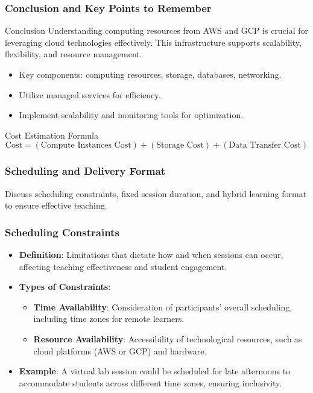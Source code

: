 \documentclass[aspectratio=169]{beamer}
\begin{document}
\begin{frame}[fragile]
    \frametitle{Conclusion and Key Points to Remember}
    \begin{block}{Conclusion}
        Understanding computing resources from AWS and GCP is crucial for leveraging cloud technologies effectively. This infrastructure supports scalability, flexibility, and resource management.
    \end{block}
    \begin{itemize}
        \item Key components: computing resources, storage, databases, networking.
        \item Utilize managed services for efficiency.
        \item Implement scalability and monitoring tools for optimization.
    \end{itemize}
    
    \begin{block}{Cost Estimation Formula}
        \begin{equation}
        \text{Cost} = (\text{Compute Instances Cost}) + (\text{Storage Cost}) + (\text{Data Transfer Cost})
        \end{equation}
    \end{block}
\end{frame}

\begin{frame}[fragile]
    \frametitle{Scheduling and Delivery Format}
    Discuss scheduling constraints, fixed session duration, and hybrid learning format to ensure effective teaching.
\end{frame}

\begin{frame}[fragile]
    \frametitle{Scheduling Constraints}
    \begin{itemize}
        \item \textbf{Definition}: Limitations that dictate how and when sessions can occur, affecting teaching effectiveness and student engagement.
        
        \item \textbf{Types of Constraints}:
        \begin{itemize}
            \item \textbf{Time Availability}: Consideration of participants' overall scheduling, including time zones for remote learners.
            \item \textbf{Resource Availability}: Accessibility of technological resources, such as cloud platforms (AWS or GCP) and hardware.
        \end{itemize}
        
        \item \textbf{Example}: 
        A virtual lab session could be scheduled for late afternoons to accommodate students across different time zones, ensuring inclusivity.
    \end{itemize}
\end{frame}
\end{document}
